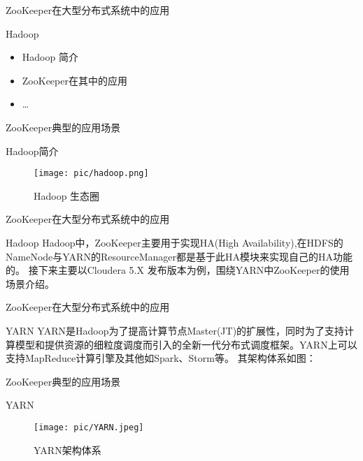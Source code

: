 \documentclass[10pt]{beamer}
\begin{document}
\begin{frame}[fragile]{ZooKeeper在大型分布式系统中的应用}
  \begin{alertblock}{Hadoop}
      \begin{itemize}
        \item Hadoop 简介
        \item ZooKeeper在其中的应用
        \item \ldots
    \end{itemize}
  \end{alertblock}
\end{frame}

\begin{frame}[fragile]{ZooKeeper典型的应用场景}
  \begin{alertblock}{Hadoop简介}
    \newline\newline
    \begin{figure}
      \texttt{[image: pic/hadoop.png]}
      \caption{Hadoop 生态圈}
    \end{figure}
  \end{alertblock}
\end{frame}

\begin{frame}[fragile]{ZooKeeper在大型分布式系统中的应用}
  \begin{alertblock}{Hadoop}
    Hadoop中，ZooKeeper主要用于实现HA(High Availability),在HDFS的NameNode与YARN的ResourceManager都是基于此HA模块来实现自己的HA功能的。\newline
    接下来主要以Cloudera 5.X 发布版本为例，围绕YARN中ZooKeeper的使用场景介绍。
  \end{alertblock}
\end{frame}

\begin{frame}[fragile]{ZooKeeper在大型分布式系统中的应用}
  \begin{alertblock}{YARN}
    YARN是Hadoop为了提高计算节点Master(JT)的扩展性，同时为了支持计算模型和提供资源的细粒度调度而引入的全新一代分布式调度框架。YARN上可以支持MapReduce计算引擎及其他如Spark、Storm等。\newline
    其架构体系如图：
  \end{alertblock}
\end{frame}

\begin{frame}[fragile]{ZooKeeper典型的应用场景}
  \begin{alertblock}{YARN}
    \newline\newline
    \begin{figure}
      \texttt{[image: pic/YARN.jpeg]}
      \caption{YARN架构体系}
    \end{figure}
  \end{alertblock}
\end{frame}
\end{document}
